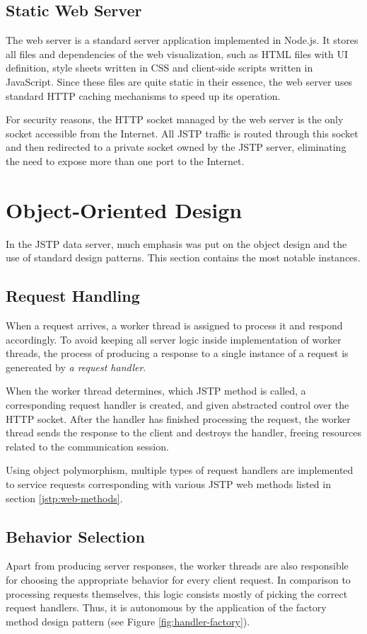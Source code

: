 \subsection{Static Web Server}
The web server is a standard server application implemented in Node.js. It stores all files and dependencies of the web visualization, such as HTML files with UI definition, style sheets written in CSS and client-side scripts written in JavaScript. Since these files are quite static in their essence, the web server uses standard HTTP caching mechanisms to speed up its operation.

For security reasons, the HTTP socket managed by the web server is the only socket accessible from the Internet. All JSTP traffic is routed through this socket and then redirected to a private socket owned by the JSTP server, eliminating the need to expose more than one port to the Internet.

\section{Object-Oriented Design}
In the JSTP data server, much emphasis was put on the object design and the use of standard design patterns. \cite{DesignPatterns} This section contains the most notable instances.

\subsection{Request Handling}
When a request arrives, a worker thread is assigned to process it and respond accordingly. To avoid keeping all server logic inside implementation of worker threads, the process of producing a response to a single instance of a request is genereated by \textit{a request handler}.

When the worker thread determines, which JSTP method is called, a corresponding request handler is created, and given abstracted control over the HTTP socket. After the handler has finished processing the request, the worker thread sends the response to the client and destroys the handler, freeing resources related to the communication session.

Using object polymorphism, multiple types of request handlers are implemented to service requests corresponding with various JSTP web methods listed in section \ref{jstp:web-methods}.

\subsection{Behavior Selection}
Apart from producing server responses, the worker threads are also responsible for choosing the appropriate behavior for every client request. In comparison to processing requests themselves, this logic consists mostly of picking the correct request handlers. Thus, it is autonomous by the application of the factory method design pattern (see Figure \ref{fig:handler-factory}). \cite{DesignPatterns}

